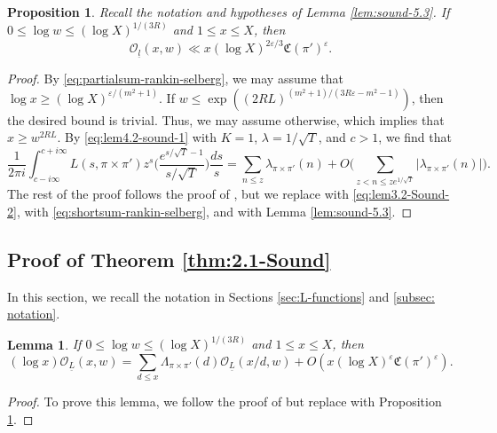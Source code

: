 \documentclass[12pt,reqno]{amsart}
\newtheorem{lem}[thm]{Lemma}
\newtheorem{prop}[thm]{Proposition}
\theoremstyle{remark}
\numberwithin{equation}{section}
\begin{document}
	
	\begin{prop}\label{prop:sound-5.4}
	    Recall the notation and hypotheses of Lemma \ref{lem:sound-5.3}.   If $0 \le \log w \le (\log X)^{1/(3R)}$ and $1 \le x \le X$, then
		\begin{equation*}
			\mathcal{O}_{\underline{l}}(x, w) \ll x(\log X)^{2\varepsilon/3}\mathfrak{C}(\pi')^\varepsilon.
		\end{equation*}
	\end{prop}
	\begin{proof}
		By \eqref{eq:partialsum-rankin-selberg}, we may assume that $\log x \ge (\log X)^{\varepsilon/(m^2+1)}$. If $w \le \exp((2RL)^{(m^2+1)/(3R\varepsilon-m^2-1)})$, then the desired bound is trivial. Thus, we may assume otherwise,  which implies that $x \ge w^{2RL}$.  
        By  \eqref{eq:lem4.2-sound-1} with $K=1$, $\lambda=1/\sqrt{T}$, and $c>1$, we find that 
		\begin{equation*}
			\frac{1}{2\pi i}\int_{c-i\infty}^{c+i\infty} L(s, \pi \times \pi') z^s\Big(\frac{e^{s/\sqrt{T}-1}}{s/\sqrt{T}}\Big)\frac{ds}{s} = \sum_{n\le z} \lambda_{\pi \times \pi'}(n) + O\Big(\sum_{z<n\le ze^{1/\sqrt{T}}}|\lambda_{\pi\times\pi'}(n)|\Big).
		\end{equation*}
        The rest of the proof follows the proof of \cite[Proposition 5.4]{S}, but we replace \cite[Lemma 3.2]{S} with \eqref{eq:lem3.2-Sound-2}, \cite[Lemma 3.3]{S} with \eqref{eq:shortsum-rankin-selberg}, and \cite[Lemma 5.3]{S} with Lemma \ref{lem:sound-5.3}.
        \end{proof}
	

 
    \subsection{Proof of Theorem \ref{thm:2.1-Sound}}
	In this section, we recall the notation  in Sections \ref{sec:L-functions} and \ref{subsec: notation}.
	
	\begin{lem}\label{lem:6.1-Sound} 
		 If $0 \le \log w \le (\log X)^{1/(3R)}$ and $1 \le x \le X$, then 
		\begin{equation*}
			(\log x)\mathcal{O}_{\underline{L}}(x, w) = \sum_{d \le x} \Lambda_{\pi \times \pi'}(d)\mathcal{O}_{\underline{L}}(x/d, w) + O(x(\log X)^\varepsilon \mathfrak{C}(\pi')^\varepsilon).
		\end{equation*}
	\end{lem}
	\begin{proof}
		To prove this lemma, we follow the proof of \cite[Lemma 6.1]{S} but replace \cite[Proposition 5.4]{S} with Proposition \ref{prop:sound-5.4}.
        \end{proof}
		
\end{document}
